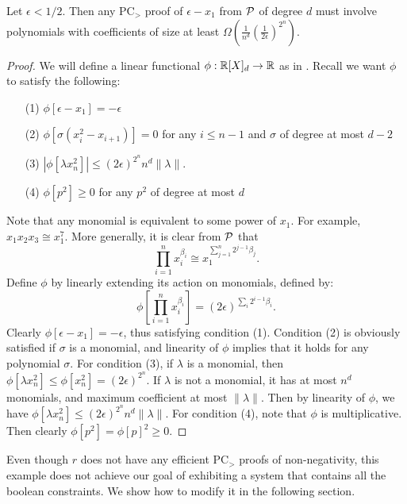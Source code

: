 \begin{lemma}\label{lem:nonbool-complex}
Let $\epsilon < 1/2$. Then any PC$_>$ proof of $\epsilon - x_1$ from $\mathcal P$ of degree $d$ must involve polynomials with coefficients of size at least $\Omega\left(\frac{1}{n^d}\left(\frac{1}{2\epsilon}\right)^{2^n}\right)$.
\end{lemma}
\begin{proof}
We will define a linear functional $\phi: \mathbb R[X]_d \rightarrow \mathbb R$ as in . Recall we want $\phi$ to satisfy the following:
\begin{enumerate}
\item[(1)] $\phi[\epsilon - x_1] = -\epsilon$
\item[(2)] $\phi[\sigma(x_i^2 - x_{i+1})] = 0$ for any $i \leq n-1$ and $\sigma$ of degree at most $d-2$
\item[(3)] $|\phi[\lambda x_n^2]| \leq (2\epsilon)^{2^{n}}n^d\|\lambda\|$.
\item[(4)] $\phi[p^2] \geq 0$ for any $p^2$ of degree at most $d$
\end{enumerate}

Note that any monomial is equivalent to some power of $x_1$. For example, $x_1x_2x_3 \cong x_1^7$.  More generally, it is clear from $\mathcal P$ that 
\[\prod_{i = 1}^n x_i^{\beta_i} \cong x_1^{\sum_{j = 1}^n 2^{j-1} \beta_j}.\] 
Define $\phi$ by linearly extending its action on monomials, defined by:
\[\phi\left[ \prod_{i = 1}^n x_i^{\beta_i}\right] = (2\epsilon)^{\sum_{i} 2^{i-1} \beta_i }. \]
Clearly $\phi[\epsilon - x_1] = -\epsilon$, thus satisfying condition (1). Condition (2) is obviously satisfied if $\sigma$ is a monomial, and linearity of $\phi$ implies that it holds for any polynomial $\sigma$. For condition (3), if $\lambda$ is a monomial, then $\phi[\lambda x_n^2] \leq \phi[x_n^2] = (2\epsilon)^{2^{n}}$. If $\lambda$ is not a monomial, it has at most $n^d$ monomials, and maximum coefficient at most $\|\lambda\|$. Then by linearity of $\phi$, we have $\phi[\lambda x_n^2] \leq (2\epsilon)^{2^n}n^d\|\lambda\|$. For condition (4), note that $\phi$ is multiplicative. Then clearly $\phi[p^2] = \phi[p]^2 \geq 0$. 
\end{proof}

Even though $r$ does not have any efficient PC$_>$ proofs of non-negativity, this example does not achieve our goal of exhibiting a system that contains all the boolean constraints. We show how to modify it in the following section.

